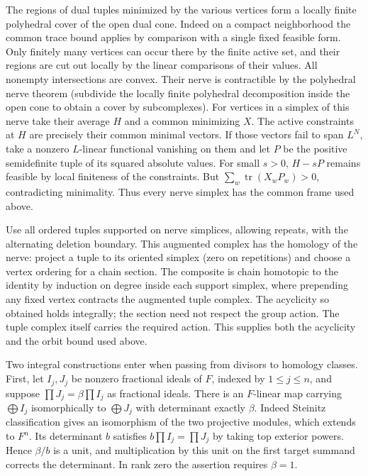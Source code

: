 \documentclass[11pt]{amsart}
\theoremstyle{definition}
\theoremstyle{remark}
\begin{document}
The regions of dual tuples minimized by the various vertices form a
locally finite polyhedral cover of the open dual cone. Indeed on a
compact neighborhood the common trace bound applies by comparison
with a single fixed feasible form. Only finitely many vertices can
occur there by the finite active set, and their regions are cut out
locally by the linear comparisons of their values. All nonempty
intersections are convex. Their nerve is contractible by the
polyhedral nerve theorem (subdivide the locally finite polyhedral
decomposition inside the open cone to obtain a cover by subcomplexes).
For vertices in a simplex of this nerve take their average $H$ and
a common minimizing $X$. The active constraints at $H$ are precisely
their common minimal vectors. If those vectors fail to span $L^N$,
take a nonzero $L$-linear functional vanishing on them and let $P$
be the positive semidefinite tuple of its squared absolute values.
For small $s>0$, $H-sP$ remains feasible by local finiteness of the
constraints. But $\sum_w\operatorname{tr}(X_wP_w)>0$, contradicting
minimality. Thus every nerve simplex has the common frame used above.

Use all ordered tuples supported on nerve simplices, allowing repeats,
with the alternating deletion boundary. This augmented complex has
the homology of the nerve: project a tuple to its oriented simplex
(zero on repetitions) and choose a vertex ordering for a chain section.
The composite is chain homotopic to the identity by induction on
degree inside each support simplex, where prepending any fixed
vertex contracts the augmented tuple complex. The acyclicity so
obtained holds integrally; the section need not respect the group
action. The tuple complex itself carries the required action. This
supplies both the acyclicity and the orbit bound used above.

Two integral constructions enter when passing from divisors to
homology classes. First, let $I_j,J_j$ be nonzero fractional ideals
of $F$, indexed by $1\le j\le n$, and suppose
$\prod J_j=\beta\prod I_j$ as fractional ideals. There is an
$F$-linear map carrying $\bigoplus I_j$ isomorphically to
$\bigoplus J_j$ with determinant exactly $\beta$. Indeed Steinitz
classification gives an isomorphism of the two projective modules,
which extends to $F^n$. Its determinant $b$ satisfies
$b\prod I_j=\prod J_j$ by taking top exterior powers. Hence
$\beta/b$ is a unit, and multiplication by this unit on the first
target summand corrects the determinant. In rank zero the assertion
requires $\beta=1$.
\end{document}
